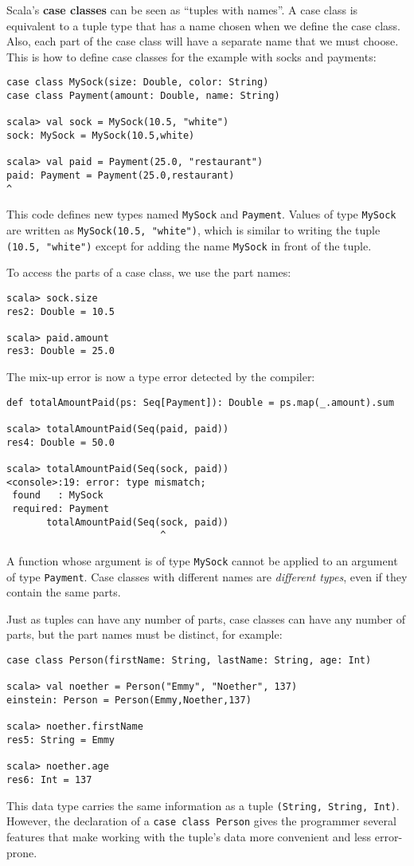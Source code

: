 Scala's \textbf{case classes} can be seen as ``tuples
with names''. A case class is equivalent to a tuple type that has
a name chosen when we define the case class. Also, each part of the
case class will have a separate name that we must choose. This is
how to define case classes for the example with socks and payments:
\begin{lstlisting}
case class MySock(size: Double, color: String)
case class Payment(amount: Double, name: String)

scala> val sock = MySock(10.5, "white")
sock: MySock = MySock(10.5,white)

scala> val paid = Payment(25.0, "restaurant")
paid: Payment = Payment(25.0,restaurant)                                  ^ 
\end{lstlisting}
This code defines new types named \lstinline!MySock! and \lstinline!Payment!.
Values of type \lstinline!MySock! are written as \lstinline!MySock(10.5, "white")!,
which is similar to writing the tuple \lstinline!(10.5, "white")!
except for adding the name \lstinline!MySock! in front of the tuple.

To access the parts of a case class, we use the part names:
\begin{lstlisting}
scala> sock.size
res2: Double = 10.5

scala> paid.amount
res3: Double = 25.0
\end{lstlisting}
The mix-up error is now a type error detected by
the compiler:
\begin{lstlisting}
def totalAmountPaid(ps: Seq[Payment]): Double = ps.map(_.amount).sum

scala> totalAmountPaid(Seq(paid, paid))
res4: Double = 50.0

scala> totalAmountPaid(Seq(sock, paid))
<console>:19: error: type mismatch;
 found   : MySock
 required: Payment
       totalAmountPaid(Seq(sock, paid))
                           ^
\end{lstlisting}
A function whose argument is of type \lstinline!MySock! cannot be
applied to an argument of type \lstinline!Payment!. Case classes
with different names are \emph{different types}, even if they contain
the same parts. 

Just as tuples can have any number of parts, case classes can have
any number of parts, but the part names must be distinct, for example:
\begin{lstlisting}
case class Person(firstName: String, lastName: String, age: Int)

scala> val noether = Person("Emmy", "Noether", 137)
einstein: Person = Person(Emmy,Noether,137)

scala> noether.firstName
res5: String = Emmy

scala> noether.age
res6: Int = 137
\end{lstlisting}
This data type carries the same information as a tuple \lstinline!(String, String, Int)!.
However, the declaration of a \lstinline!case class Person! gives
the programmer several features that make working with the tuple's
data more convenient and less error-prone.

